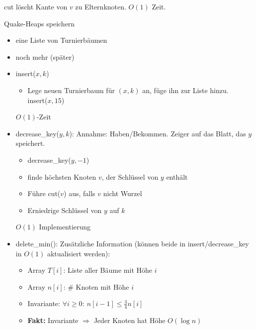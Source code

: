 \begin{itemize}
\begin{enumerate}
\begin{center}
\begin{minipage}{3cm}
{{          }
      }
       \end{minipage}
       \hspace{0.5em}
       \begin{minipage}{3cm}
        \centering
       \end{minipage}
      \end{center}
      cut löscht Kante von $v$ zu Elternknoten. $O(1)$ Zeit.
 \end{enumerate}
\end{itemize}

Quake-Heaps speichern
\begin{itemize}
 \item eine Liste von Turnierbäumen
 \item noch mehr (später)
 \item insert($x,k$)
    \begin{itemize}
    \item Lege neuen Turnierbaum für $(x,k)$ an, füge ihn zur Liste hinzu. \\
    insert($x, 15$)
    \end{itemize}
    $O(1)$-Zeit
 \item decrease\_key($y,k$): Annahme: Haben/Bekommen. Zeiger auf das Blatt, das $y$ speichert.
     \begin{itemize}
     \item decrease\_key($y,-1$)
     \item finde höchsten Knoten $v$, der Schlüssel von $y$ enthält
     \item Führe cut($v$) aus, falls $v$ nicht Wurzel
     \item Erniedrige Schlüssel von $y$ auf $k$
     \end{itemize}
     $O(1)$ Implementierung
 \item delete\_min(): Zusätzliche Information (können beide in insert/decrease\_key in $O(1)$ aktualisiert werden):
     \begin{itemize}
      \item Array $T[i]$: Liste aller Bäume mit Höhe $i$
      \item Array $n[i]$: \# Knoten mit Höhe $i$
      \item Invariante: $\forall i \geq 0{:}\ n[i-1] \leq \frac{3}{4} n[i]$
      \item \textbf{Fakt:} Invariante $\Rightarrow$ Jeder Knoten hat Höhe $O(\log n)$

\end{itemize}
\end{itemize}
